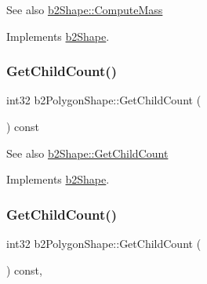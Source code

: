 \begin{DoxySeeAlso}{See also}
\hyperlink{classb2Shape_a61b365526241b47f124789b0309cac69}{b2\+Shape\+::\+Compute\+Mass} 
\end{DoxySeeAlso}


Implements \hyperlink{classb2Shape_a61b365526241b47f124789b0309cac69}{b2\+Shape}.

\mbox{\label{classb2PolygonShape_aa8fba2b51d81111b7e681768093ac197}} 
\subsubsection{\texorpdfstring{Get\+Child\+Count()}{GetChildCount()}\hspace{0.1cm}{\footnotesize\ttfamily [1/2]}}
{\footnotesize\ttfamily int32 b2\+Polygon\+Shape\+::\+Get\+Child\+Count (\begin{DoxyParamCaption}{ }\end{DoxyParamCaption}) const\hspace{0.3cm}{\ttfamily [virtual]}}

\begin{DoxySeeAlso}{See also}
\hyperlink{classb2Shape_a05a3c445017d96df9238ceefe6ce37ab}{b2\+Shape\+::\+Get\+Child\+Count} 
\end{DoxySeeAlso}


Implements \hyperlink{classb2Shape_a05a3c445017d96df9238ceefe6ce37ab}{b2\+Shape}.

\mbox{\label{classb2PolygonShape_aa8bb0d5a88624104425cdee0b2f4427a}} 
\subsubsection{\texorpdfstring{Get\+Child\+Count()}{GetChildCount()}\hspace{0.1cm}{\footnotesize\ttfamily [2/2]}}
{\footnotesize\ttfamily int32 b2\+Polygon\+Shape\+::\+Get\+Child\+Count (\begin{DoxyParamCaption}{ }\end{DoxyParamCaption}) const\hspace{0.3cm}{\ttfamily [override]}, {\ttfamily [virtual]}}

